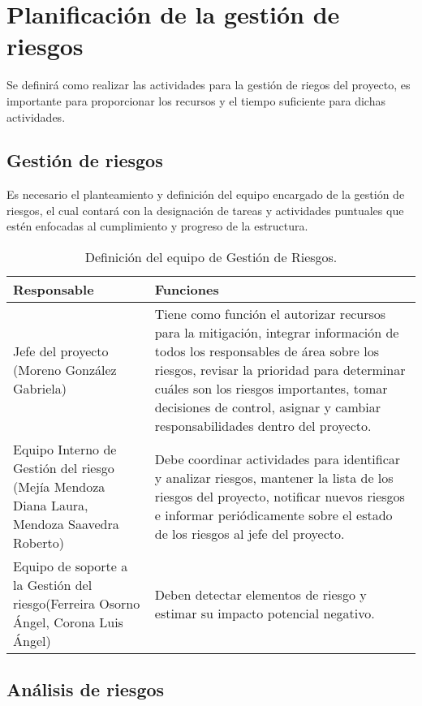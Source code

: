 \chapter{Planificación de la gestión de riesgos}	
\label{cap:alcance}
 
Se definirá como realizar las actividades para la gestión de riegos del proyecto, es importante para proporcionar los recursos y el tiempo suficiente para dichas actividades.

\section{Gestión de riesgos}
Es necesario el planteamiento y definición del equipo encargado de la gestión de riesgos, el cual contará con la designación de tareas y actividades puntuales que estén enfocadas al cumplimiento y progreso de la estructura.

\begin{table}[hbtp!]
	\noindent\begin{tabular}{|p{}|p{}|}
		\hline
		{\bf Responsable} & {\bf Funciones}\\
		\hline
		Jefe del proyecto (Moreno González Gabriela) & Tiene como función el autorizar recursos para la mitigación, integrar información de todos los responsables de área sobre los riesgos,
		revisar la prioridad para determinar cuáles son los riesgos importantes, tomar decisiones de control, asignar y cambiar 	responsabilidades dentro del proyecto. \\
		\hline	 
		Equipo Interno de Gestión del riesgo (Mejía Mendoza Diana Laura, Mendoza Saavedra Roberto) & Debe coordinar actividades para identificar y analizar riesgos, mantener la lista de los riesgos del proyecto, notificar nuevos riesgos e informar periódicamente sobre el estado de los riesgos al jefe del proyecto. \\
		\hline
		Equipo de soporte a la Gestión del riesgo(Ferreira Osorno Ángel, Corona Luis Ángel) & Deben detectar elementos de riesgo y estimar su impacto potencial negativo. \\
		\hline
	\end{tabular}
	\caption{Definición del equipo de Gestión de Riesgos.}
	\label{tbl:DefinicionEquipoGestionRiegos}
\end{table}



\section{Análisis de riesgos}


